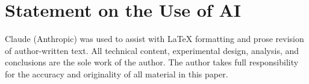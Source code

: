 \documentclass[10pt]{cai26}
\begin{document}
\printbibliography[heading=subbibintoc]

\section*{Statement on the Use of AI}
Claude (Anthropic) was used to assist with \LaTeX{} formatting and prose revision of author-written text. All technical content, experimental design, analysis, and conclusions are the sole work of the author. The author takes full responsibility for the accuracy and originality of all material in this paper.
\end{document}
